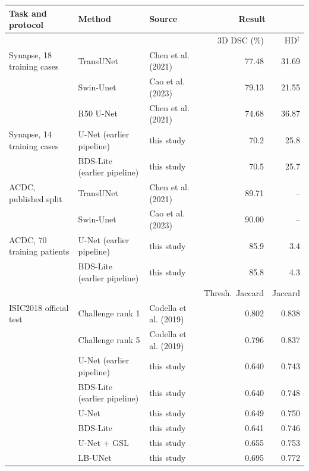 \begin{tabular}{lllrr}
\toprule
Task and protocol & Method & Source & \multicolumn{2}{c}{Result} \\
\midrule
 & & & 3D DSC (\%) & HD$^\dagger$ \\
Synapse, 18 training cases & TransUNet & Chen et al. (2021) & 77.48 & 31.69 \\
 & Swin-Unet & Cao et al. (2023) & 79.13 & 21.55 \\
 & R50 U-Net & Chen et al. (2021) & 74.68 & 36.87 \\
Synapse, 14 training cases & U-Net (earlier pipeline) & this study & 70.2 & 25.8 \\
 & BDS-Lite (earlier pipeline) & this study & 70.5 & 25.7 \\
\midrule
ACDC, published split & TransUNet & Chen et al. (2021) & 89.71 & -- \\
 & Swin-Unet & Cao et al. (2023) & 90.00 & -- \\
ACDC, 70 training patients & U-Net (earlier pipeline) & this study & 85.9 & 3.4 \\
 & BDS-Lite (earlier pipeline) & this study & 85.8 & 4.3 \\
\midrule
 & & & Thresh.\ Jaccard & Jaccard \\
ISIC2018 official test & Challenge rank 1 & Codella et al. (2019) & 0.802 & 0.838 \\
 & Challenge rank 5 & Codella et al. (2019) & 0.796 & 0.837 \\
 & U-Net (earlier pipeline) & this study & 0.640 & 0.743 \\
 & BDS-Lite (earlier pipeline) & this study & 0.640 & 0.748 \\
 & U-Net & this study & 0.649 & 0.750 \\
 & BDS-Lite & this study & 0.641 & 0.746 \\
 & U-Net + GSL & this study & 0.655 & 0.753 \\
 & LB-UNet & this study & 0.695 & 0.772 \\
\bottomrule
\end{tabular}
